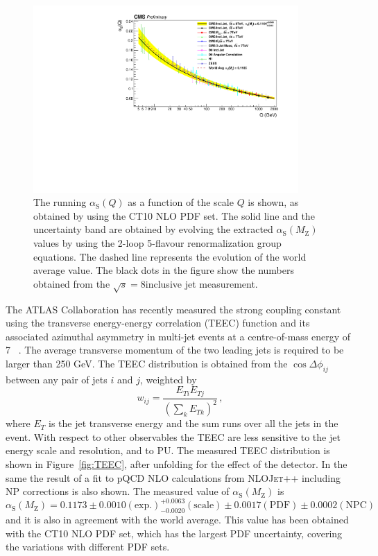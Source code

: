 \documentclass{PoS}
\providecommand{\NLOJETPP} {{\textsc{NLOJet++}}\xspace}
\def\asq{\ensuremath{\alpha_\mathrm{S}(Q)}\xspace}
\providecommand{\alpsmz}{\ensuremath{\alpha_\mathrm{S}(M_\mathrm{Z})}\xspace}
\begin{document}
\begin{figure}[hbpt]
  \centering
 \includegraphics[width=0.9\textwidth]{Figure4.pdf}
 \caption{The running \asq as a function of the scale $Q$ is shown, as
   obtained by using the CT10 NLO PDF set. The solid line and the
   uncertainty band are obtained by evolving the extracted \alpsmz
   values by using the 2-loop 5-flavour renormalization group
   equations. The dashed line represents the evolution of the world
   average value. The black dots in the figure show the numbers
   obtained from the $\sqrt{s}=8$\TeV inclusive jet
   measurement. %
 }
\label{fig:AlphasRun}
\end{figure}

The ATLAS Collaboration has recently measured the strong coupling constant using the transverse energy-energy
correlation (TEEC) function and its associated azimuthal asymmetry in multi-jet events at a
centre-of-mass energy of 7 \TeV~\cite{ATLAS:2015yaa}. The average transverse momentum of the two leading jets is
required to be larger than 250 GeV. The TEEC distribution is obtained from the $\cos\Delta\phi_{ij}$ between any pair of
jets $i$ and $j$, weighted by $$w_{ij} = \frac{E_{Ti}E_{Tj}}{(\sum_k E_{Tk})^2} \, ,$$ where $E_T$ is the jet transverse
energy and the sum runs over all the
jets in the event. With respect to other observables the TEEC are less sensitive to the jet energy scale and resolution,
and to PU. The measured TEEC distribution is shown in Figure~\ref{fig:TEEC}, after unfolding for the effect of
the detector. In the same the result of a fit to pQCD NLO calculations from \NLOJETPP including NP
corrections is also shown. The measured value of \alpsmz is 
$$ \alpsmz  = 0.1173 \pm 0.0010 \mathrm{(exp.)} ^{+0.0063}_{-0.0020} \mathrm{(scale)} \pm 0.0017 \mathrm{(PDF)} \pm
0.0002 \mathrm{(NPC)} \, $$
and it is also in agreement with the world average. This value has been obtained with the CT10 NLO PDF set, which has
the largest PDF uncertainty, covering the variations with different PDF sets.
\end{document}
